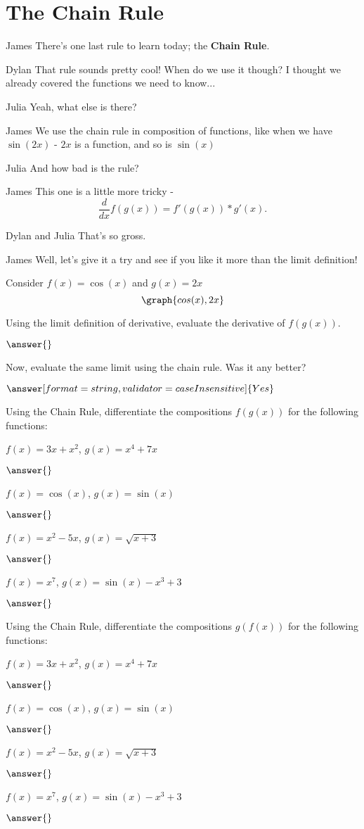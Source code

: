 \documentclass{ximera}
\begin{document}
\section{The Chain Rule}
\begin{dialogue}
\item[James] There's one last rule to learn today; the \textbf{Chain Rule}.
\item[Dylan] That rule sounds pretty cool! When do we use it though? I thought we already covered the functions we need to know...
\item[Julia] Yeah, what else is there?
\item[James] We use the chain rule in composition of functions, like when we have $\sin(2x)$ - $2x$ is a function, and so is $\sin(x)$
\item[Julia] And how bad is the rule?
\item[James] This one is a little more tricky - $$\frac{d}{dx}f(g(x)) = f'(g(x))*g'(x)\text{.}$$
\item[Dylan and Julia] That's so gross.
\item[James] Well, let's give it a try and see if you like it more than the limit definition!
\end{dialogue}
\begin{question}
Consider $f(x) = \cos(x)$ and $g(x) = 2x$
\[
\graph{cos(x), 2x}
\]

Using the limit definition of derivative, evaluate the derivative of $f(g(x))$.

$\answer{}$

Now, evaluate the same limit using the chain rule. Was it any better?

$\answer[format=string,validator=caseInsensitive]{Yes}$
\end{question}
\begin{question}

Using the Chain Rule, differentiate the compositions $f(g(x))$ for the following functions:

$f(x) = 3x+x^2$, $g(x) = x^4+7x$

$\answer{}$

$f(x) = \cos(x)$, $g(x) = \sin(x)$

$\answer{}$

$f(x) = x^2-5x$, $g(x) = \sqrt{x+3}$

$\answer{}$

$f(x) = x^7$, $g(x) = \sin(x)-x^3+3$

$\answer{}$
\end{question}

\begin{question}

Using the Chain Rule, differentiate the compositions $g(f(x))$ for the following functions:

$f(x) = 3x+x^2$, $g(x) = x^4+7x$

$\answer{}$

$f(x) = \cos(x)$, $g(x) = \sin(x)$

$\answer{}$

$f(x) = x^2-5x$, $g(x) = \sqrt{x+3}$

$\answer{}$

$f(x) = x^7$, $g(x) = \sin(x)-x^3+3$

$\answer{}$
\end{question}
\end{document}
